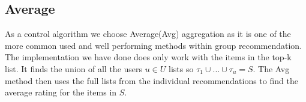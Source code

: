 \subsection{Average}\label{sec:average}
As a control algorithm we choose Average(Avg) aggregation as it is one of the more common used and well performing methods within group recommendation. The implementation we have done does only work with the items in the top-k list. It finds the union of all the users $u\in U$ lists so $\tau_1 \cup ... \cup \tau_u = S$. The Avg method then uses the full lists from the individual recommendations to find the average rating for the items in $S$.